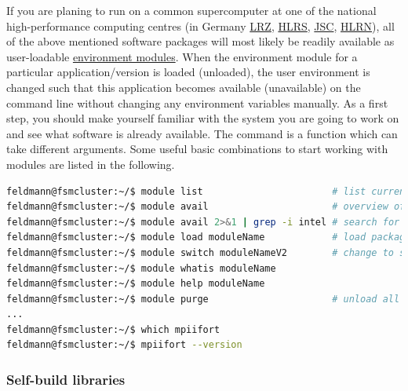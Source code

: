 \documentclass[a4paper, 11pt, DIV=11]{scrartcl}
\begin{document}
If you are planing to run \nsc on a common supercomputer at one of the national
high-performance computing centres (\eg in Germany
\href{https://www.lrz.de/english/}{LRZ},
\href{https://www.hlrs.de/home/}{HLRS},
\href{http://www.fz-juelich.de/ias/jsc/EN/Home/home_node.html}{JSC},
\href{https://www.hlrn.de/home/}{HLRN}),
all of the above mentioned software packages will most likely be readily available
as user-loadable \href{http://modules.sourceforge.net/}{environment modules}.
When the environment module for a particular application/version is loaded
(unloaded), the user environment is changed such that this application becomes
available (unavailable) on the command line without changing any environment
variables manually. As a first step, you should make yourself familiar with the
system you are going to work on and see what software is already available. The
 command is a function which can take different arguments. Some useful basic
combinations to start working with modules are listed in the following.
\begin{lstlisting}[language=bash]
feldmann@fsmcluster:~/$ module list                       # list currently loaded packages
feldmann@fsmcluster:~/$ module avail                      # overview of available packages
feldmann@fsmcluster:~/$ module avail 2>&1 | grep -i intel # search for specific things
feldmann@fsmcluster:~/$ module load moduleName            # load package, default version
feldmann@fsmcluster:~/$ module switch moduleNameV2        # change to specific version
feldmann@fsmcluster:~/$ module whatis moduleName
feldmann@fsmcluster:~/$ module help moduleName
feldmann@fsmcluster:~/$ module purge                      # unload all packages
...
feldmann@fsmcluster:~/$ which mpiifort
feldmann@fsmcluster:~/$ mpiifort --version
\end{lstlisting}

\subsubsection{Self-build libraries}
\label{sec:selfBuildLibraries}
\end{document}

